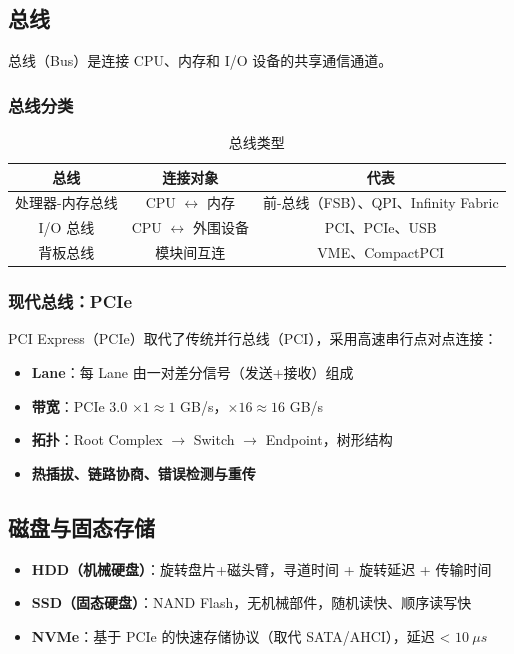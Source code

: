 \subsection{总线}

总线（Bus）是连接 CPU、内存和 I/O 设备的共享通信通道。

\subsubsection{总线分类}

\begin{table}[H]
\centering
\caption{总线类型}
\label{tab:bus_types}
\begin{tabulary}{\textwidth}{CCC}
\toprule
\textbf{总线} & \textbf{连接对象} & \textbf{代表} \\
\midrule
处理器-内存总线 & CPU $\leftrightarrow$ 内存 & 前-总线（FSB）、QPI、Infinity Fabric \\
I/O 总线 & CPU $\leftrightarrow$ 外围设备 & PCI、PCIe、USB \\
背板总线 & 模块间互连 & VME、CompactPCI \\
\bottomrule
\end{tabulary}
\end{table}

\subsubsection{现代总线：PCIe}

PCI Express（PCIe）取代了传统并行总线（PCI），采用高速串行点对点连接：

\begin{itemize}
    \item \textbf{Lane}：每 Lane 由一对差分信号（发送+接收）组成
    \item \textbf{带宽}：PCIe 3.0 $\times 1 \approx 1$ GB/s，$\times 16 \approx 16$ GB/s
    \item \textbf{拓扑}：Root Complex $\to$ Switch $\to$ Endpoint，树形结构
    \item \textbf{热插拔、链路协商、错误检测与重传}
\end{itemize}

\subsection{磁盘与固态存储}

\begin{itemize}
    \item \textbf{HDD（机械硬盘）}：旋转盘片+磁头臂，寻道时间 + 旋转延迟 + 传输时间
    \item \textbf{SSD（固态硬盘）}：NAND Flash，无机械部件，随机读快、顺序读写快
    \item \textbf{NVMe}：基于 PCIe 的快速存储协议（取代 SATA/AHCI），延迟 < $10~\mu s$
\end{itemize}

